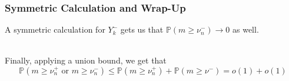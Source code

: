 \documentclass{beamer}
\begin{document}
\begin{frame}
\frametitle{Symmetric Calculation and Wrap-Up}

A symmetric calculation for \(Y_{k}^{-}\) gets us that \(\mathbb{P}(m \geq \nu_{n}^{-}) \to 0\) as well. \\~\ \pause

Finally, applying a union bound, we get that
\[\mathbb{P}(m \geq \nu_{n}^{+} \text{ or } m \geq \nu_{n}^{-}) \leq \mathbb{P}(m \geq \nu_{n}^{+}) + \mathbb{P}(m \geq \nu^{-}) = o(1) + o(1)\]
\end{frame}
\end{document}
